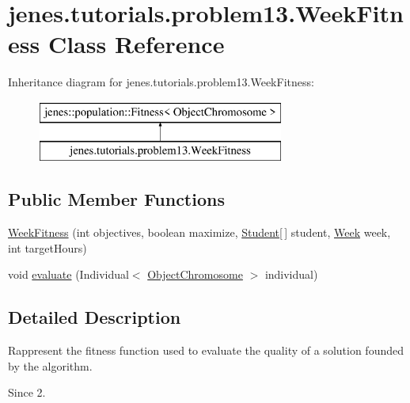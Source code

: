\hypertarget{classjenes_1_1tutorials_1_1problem13_1_1_week_fitness}{\section{jenes.\-tutorials.\-problem13.\-Week\-Fitness Class Reference}
\label{classjenes_1_1tutorials_1_1problem13_1_1_week_fitness}
}
Inheritance diagram for jenes.\-tutorials.\-problem13.\-Week\-Fitness\-:\begin{figure}[H]
\begin{center}
\leavevmode
\includegraphics[height=2.000000cm]{classjenes_1_1tutorials_1_1problem13_1_1_week_fitness}
\end{center}
\end{figure}
\subsection*{Public Member Functions}
\begin{DoxyCompactItemize}
\item 
\hyperlink{classjenes_1_1tutorials_1_1problem13_1_1_week_fitness_a68e89aa16f8e8c6ad6b7775a1994fb48}{Week\-Fitness} (int objectives, boolean maximize, \hyperlink{classjenes_1_1tutorials_1_1problem13_1_1_student}{Student}\mbox{[}$\,$\mbox{]} student, \hyperlink{classjenes_1_1tutorials_1_1problem13_1_1_week}{Week} week, int target\-Hours)
\item 
void \hyperlink{classjenes_1_1tutorials_1_1problem13_1_1_week_fitness_ad019aceef870bff9b8843982465bb7cc}{evaluate} (Individual$<$ \hyperlink{classjenes_1_1chromosome_1_1_object_chromosome}{Object\-Chromosome} $>$ individual)
\end{DoxyCompactItemize}


\subsection{Detailed Description}
Rappresent the fitness function used to evaluate the quality of a solution founded by the algorithm.

\begin{DoxySince}{Since}
2. 
\end{DoxySince}


